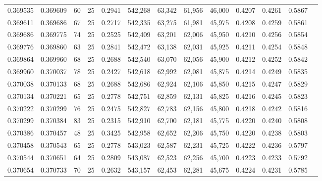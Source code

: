 \begin{tabular}{rrrrrrrrrrrrr}
0.369535 & 0.369609 &    60 &  25 &                                     0.2941 & 542,268 &  63,342 &  61,956 &  46,000 & 0.4207 & 0.4261 & 0.5867 \\
0.369611 & 0.369686 &    67 &  25 &                                     0.2717 & 542,335 &  63,275 &  61,981 &  45,975 & 0.4208 & 0.4259 & 0.5861 \\
0.369686 & 0.369775 &    74 &  25 &                                     0.2525 & 542,409 &  63,201 &  62,006 &  45,950 & 0.4210 & 0.4256 & 0.5854 \\
0.369776 & 0.369860 &    63 &  25 &                                     0.2841 & 542,472 &  63,138 &  62,031 &  45,925 & 0.4211 & 0.4254 & 0.5848 \\
0.369864 & 0.369960 &    68 &  25 &                                     0.2688 & 542,540 &  63,070 &  62,056 &  45,900 & 0.4212 & 0.4252 & 0.5842 \\
0.369960 & 0.370037 &    78 &  25 &                                     0.2427 & 542,618 &  62,992 &  62,081 &  45,875 & 0.4214 & 0.4249 & 0.5835 \\
0.370038 & 0.370133 &    68 &  25 &                                     0.2688 & 542,686 &  62,924 &  62,106 &  45,850 & 0.4215 & 0.4247 & 0.5829 \\
0.370134 & 0.370221 &    65 &  25 &                                     0.2778 & 542,751 &  62,859 &  62,131 &  45,825 & 0.4216 & 0.4245 & 0.5823 \\
0.370222 & 0.370299 &    76 &  25 &                                     0.2475 & 542,827 &  62,783 &  62,156 &  45,800 & 0.4218 & 0.4242 & 0.5816 \\
0.370299 & 0.370384 &    83 &  25 &                                     0.2315 & 542,910 &  62,700 &  62,181 &  45,775 & 0.4220 & 0.4240 & 0.5808 \\
0.370386 & 0.370457 &    48 &  25 &                                     0.3425 & 542,958 &  62,652 &  62,206 &  45,750 & 0.4220 & 0.4238 & 0.5803 \\
0.370458 & 0.370543 &    65 &  25 &                                     0.2778 & 543,023 &  62,587 &  62,231 &  45,725 & 0.4222 & 0.4236 & 0.5797 \\
0.370544 & 0.370651 &    64 &  25 &                                     0.2809 & 543,087 &  62,523 &  62,256 &  45,700 & 0.4223 & 0.4233 & 0.5792 \\
0.370654 & 0.370733 &    70 &  25 &                                     0.2632 & 543,157 &  62,453 &  62,281 &  45,675 & 0.4224 & 0.4231 & 0.5785 \\

\end{tabular}
